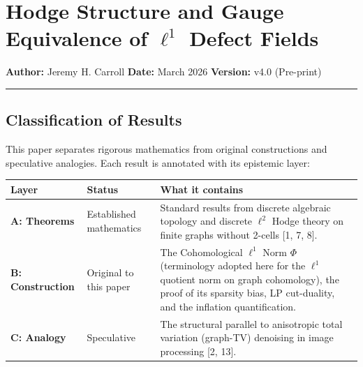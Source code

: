 \documentclass[
]{article}
\author{}
\date{}
\begin{document}
\section{\texorpdfstring{Hodge Structure and Gauge Equivalence of
\(\ell^1\) Defect
Fields}{Hodge Structure and Gauge Equivalence of \textbackslash ell\^{}1 Defect Fields}}\label{hodge-structure-and-gauge-equivalence-of-ell1-defect-fields}

\textbf{Author:} Jeremy H. Carroll \textbf{Date:} March 2026
\textbf{Version:} v4.0 (Pre-print)

\begin{center}\rule{0.5\linewidth}{0.5pt}\end{center}

\subsection{Classification of Results}\label{classification-of-results}

This paper separates rigorous mathematics from original constructions
and speculative analogies. Each result is annotated with its epistemic
layer:

\begin{longtable}[]{@{}
  >{\raggedright\arraybackslash}p{}
  >{\raggedright\arraybackslash}p{}
  >{\raggedright\arraybackslash}p{}@{}}
\toprule\noalign{}
\begin{minipage}[b]{\linewidth}\raggedright
Layer
\end{minipage} & \begin{minipage}[b]{\linewidth}\raggedright
Status
\end{minipage} & \begin{minipage}[b]{\linewidth}\raggedright
What it contains
\end{minipage} \\
\midrule\noalign{}
\endhead
\bottomrule\noalign{}
\endlastfoot
\textbf{A: Theorems} & Established mathematics & Standard results from
discrete algebraic topology and discrete \(\ell^2\) Hodge theory on
finite graphs without 2-cells {[}1, 7, 8{]}. \\
\textbf{B: Construction} & Original to this paper & The Cohomological
\(\ell^1\) Norm \(\Phi\) (terminology adopted here for the \(\ell^1\)
quotient norm on graph cohomology), the proof of its sparsity bias, LP
cut-duality, and the inflation quantification. \\
\textbf{C: Analogy} & Speculative & The structural parallel to
anisotropic total variation (graph-TV) denoising in image processing
{[}2, 13{]}. \\
\end{longtable}
\end{document}
